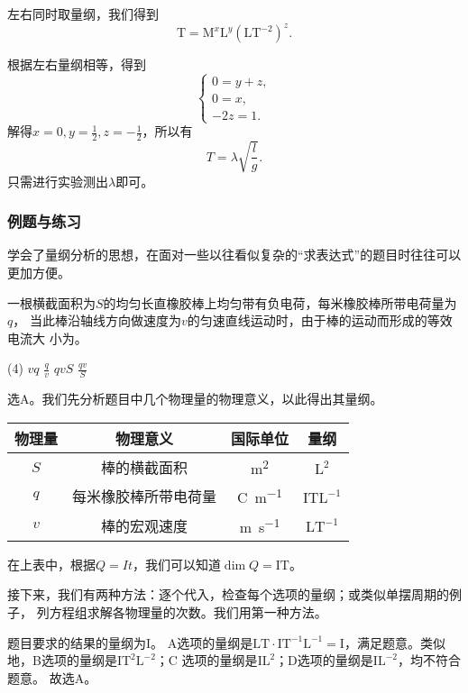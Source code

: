 左右同时取量纲，我们得到
\[
    \mathrm{T} = \mathrm{M}^{x}\mathrm{L}^{y}\left( \mathrm{LT}^{-2} \right)^{z} 
.\] 

根据左右量纲相等，得到
\[
    \begin{cases}
        0=y+z,\\
        0=x,\\
        -2z=1.
    \end{cases}
\] 
解得$x=0,y=\frac{1}{2},z=-\frac{1}{2}$，所以有
\[
    T = \lambda \sqrt{\frac{l}{g}} 
.\] 
只需进行实验测出$\lambda$即可。

\subsubsection{例题与练习}

学会了量纲分析的思想，在面对一些以往看似复杂的“求表达式”的题目时往往可以更加方便。

\begin{rawexp}\label{exp:current_expl}
    一根横截面积为$S$的均匀长直橡胶棒上均匀带有负电荷，每米橡胶棒所带电荷量为$q$，
    当此棒沿轴线方向做速度为$v$的匀速直线运动时，由于棒的运动而形成的等效电流大
    小为\choiceblank。

    \begin{tasks}(4)
        \task $vq$
        \task $\frac{q}{v}$
        \task $qvS$
        \task $\frac{qv}{S}$
    \end{tasks}
\end{rawexp}

\begin{rawsol}
    选A。我们先分析题目中几个物理量的物理意义，以此得出其量纲。

    \begin{table}[H]
        \centering
        \begin{tabular}{cccc}
            \toprule
            物理量 & 物理意义 & 国际单位 & 量纲 \\
            \midrule
            $S$ & 棒的横截面积 & \unit{\square\metre} & $\mathrm{L^2}$ \\
            $q$ & 每米橡胶棒所带电荷量 & \unit{\coulomb\per\metre} & 
            $\mathrm{ITL^{-1}}$ \\
            $v$ & 棒的宏观速度 & \unit{\meter\per\second} & $\mathrm{LT^{-1}}$ 
            \\
            \bottomrule
        \end{tabular}
    \end{table}
    
    在上表中，根据$Q=It$，我们可以知道$\dim Q=\mathrm{IT}$。

    接下来，我们有两种方法：逐个代入，检查每个选项的量纲；或类似单摆周期的例子，
    列方程组求解各物理量的次数。我们用第一种方法。

    题目要求的结果的量纲为$\mathrm{I}$。 A选项的量纲是$\mathrm{LT\cdot%
    IT^{-1}L^{-1} = I}$，满足题意。类似地，B选项的量纲是$\mathrm{IT^2L^{-2}}$；C
    选项的量纲是$\mathrm{IL^2}$；D选项的量纲是$\mathrm{IL^{-2}}$，均不符合题意。
    故选A。
\end{rawsol}

